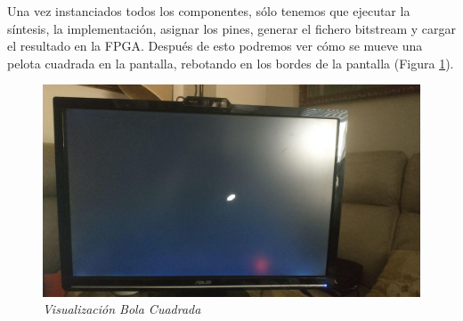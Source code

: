 Una vez instanciados todos los componentes, sólo tenemos que ejecutar la síntesis, la implementación, asignar los pines, generar el 
fichero bitstream y cargar el resultado en la FPGA. Después de esto podremos ver cómo se mueve una pelota cuadrada en la pantalla, 
rebotando en los bordes de la pantalla (Figura \ref{bola}).

\begin{figure}[H]
    \centering
    \includegraphics[width = 1\textwidth]{imagenes/bola.png}
    \caption{\textit{Visualización Bola Cuadrada}}\label{bola}
\end{figure}